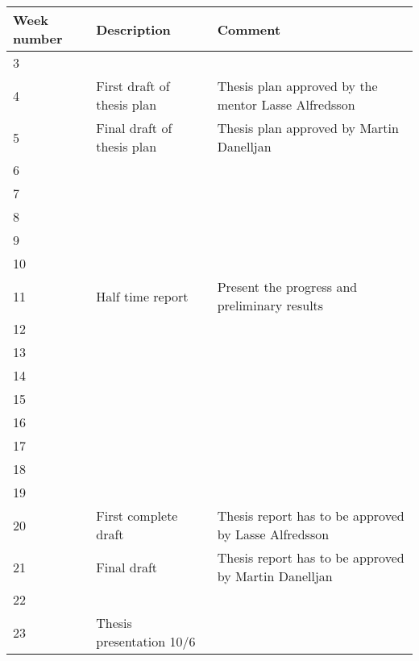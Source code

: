 

\begin{tabular}{|l|l|l|}
	\hline
	Week number & Description                & Comment                                              \\ \hline
	3           &                            &  \\ \hline
	4           & First draft of thesis plan & Thesis plan approved by the mentor Lasse Alfredsson  \\ \hline
	5           & Final draft of thesis plan & Thesis plan approved by Martin Danelljan             \\ \hline
	6           &                            &  \\ \hline
	7           &                            &  \\ \hline
	8           &                            &  \\ \hline
	9           &                            &  \\ \hline
	10          &                            &  \\ \hline
	11          & Half time report           & Present the progress and preliminary results         \\ \hline
	12          &                            &  \\ \hline
	13          &                            &  \\ \hline
	14          &                            &  \\ \hline
	15          &                            &  \\ \hline
	16          &                            &  \\ \hline
	17          &                            &  \\ \hline
	18          &                            &  \\ \hline
	19          &                            &  \\ \hline
	20          & First complete draft       & Thesis report has to be approved by Lasse Alfredsson \\ \hline
	21          & Final draft                & Thesis report has to be approved by Martin Danelljan \\ \hline
	22          &                            &  \\ \hline
	23          & Thesis presentation 10/6   &  \\ \hline
\end{tabular}